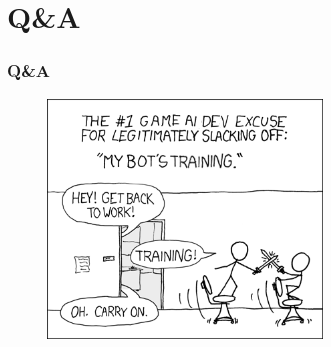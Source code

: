 \documentclass{beamer}
\begin{document}
\section*{Q\&A}

\begin{frame}
  \frametitle{Q\&A}

  \begin{figure}
    \centering
    \includegraphics[width=0.65\textwidth]{training.png}
  \end{figure}
\end{frame}
\end{document}
